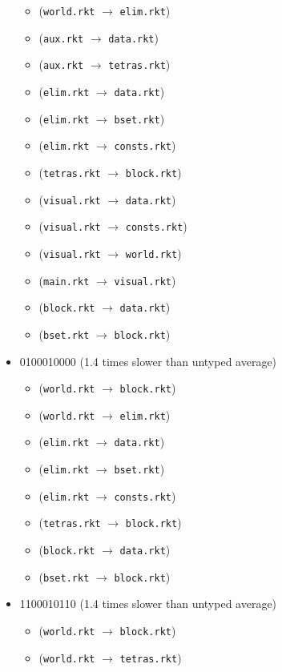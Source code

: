\documentclass{article}
\newcommand{\mono}[1]{\texttt{#1}}
\begin{document}
\begin{itemize}
\begin{itemize}
  \item (\mono{world.rkt} $\rightarrow$ \mono{elim.rkt})
  \item (\mono{aux.rkt} $\rightarrow$ \mono{data.rkt})
  \item (\mono{aux.rkt} $\rightarrow$ \mono{tetras.rkt})
  \item (\mono{elim.rkt} $\rightarrow$ \mono{data.rkt})
  \item (\mono{elim.rkt} $\rightarrow$ \mono{bset.rkt})
  \item (\mono{elim.rkt} $\rightarrow$ \mono{consts.rkt})
  \item (\mono{tetras.rkt} $\rightarrow$ \mono{block.rkt})
  \item (\mono{visual.rkt} $\rightarrow$ \mono{data.rkt})
  \item (\mono{visual.rkt} $\rightarrow$ \mono{consts.rkt})
  \item (\mono{visual.rkt} $\rightarrow$ \mono{world.rkt})
  \item (\mono{main.rkt} $\rightarrow$ \mono{visual.rkt})
  \item (\mono{block.rkt} $\rightarrow$ \mono{data.rkt})
  \item (\mono{bset.rkt} $\rightarrow$ \mono{block.rkt})
  \end{itemize}
\item 0100010000 (1.4 times slower than untyped average)
  \begin{itemize}
  \item (\mono{world.rkt} $\rightarrow$ \mono{block.rkt})
  \item (\mono{world.rkt} $\rightarrow$ \mono{elim.rkt})
  \item (\mono{elim.rkt} $\rightarrow$ \mono{data.rkt})
  \item (\mono{elim.rkt} $\rightarrow$ \mono{bset.rkt})
  \item (\mono{elim.rkt} $\rightarrow$ \mono{consts.rkt})
  \item (\mono{tetras.rkt} $\rightarrow$ \mono{block.rkt})
  \item (\mono{block.rkt} $\rightarrow$ \mono{data.rkt})
  \item (\mono{bset.rkt} $\rightarrow$ \mono{block.rkt})
  \end{itemize}
\item 1100010110 (1.4 times slower than untyped average)
  \begin{itemize}
  \item (\mono{world.rkt} $\rightarrow$ \mono{block.rkt})
  \item (\mono{world.rkt} $\rightarrow$ \mono{tetras.rkt})

\end{itemize}
\end{itemize}
\end{document}
